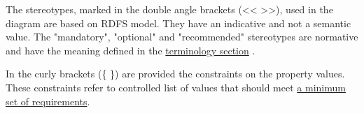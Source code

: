 The stereotypes, marked in the double angle brackets
(\textless{}\textless{} \textgreater{}\textgreater{}), used in the
diagram are based on RDFS model. They have an indicative and not a
semantic value. The "mandatory", "optional" and "recommended"
stereotypes are normative and have the meaning defined in the
\href{ap-terminology.html\#ap-terminology}{terminology section} .

In the curly brackets (\{ \}) are provided the constraints on the
property values. These constraints refer to controlled list of values
that should meet \href{ap-controlled-vocabulary-requirements.html}{a
minimum set of requirements}.



